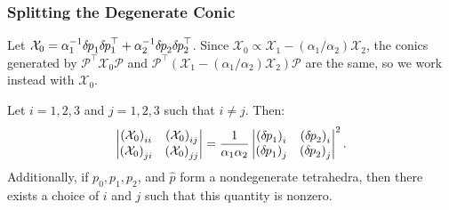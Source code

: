 \documentclass{article}
\begin{document}
\subsubsection*{Splitting the Degenerate Conic}

Let
$\mathcal{X}_0 = \alpha_1^{-1} {\delta \hspace{-0.08em} p}_1 {\delta \hspace{-0.08em} p}_1^\top +
\alpha_2^{-1} {\delta \hspace{-0.08em} p}_2 {\delta \hspace{-0.08em} p}_2^\top$. Since
$\mathcal{X}_0 \propto \mathcal{X}_1 - (\alpha_1/\alpha_2)
\mathcal{X}_2$, the conics generated by
$\mathcal{P}^\top \mathcal{X}_0 \mathcal{P}$ and
$\mathcal{P}^\top {(\mathcal{X}_1 - (\alpha_1/\alpha_2)
  \mathcal{X}_2)} \mathcal{P}$ are the same, so we work instead with
$\mathcal{X}_0$.

\begin{lemma}
  Let $i = 1, 2, 3$ and $j = 1, 2, 3$ such that $i \neq j$. Then:
  \begin{align*}
    \left|\begin{matrix}
      {(\mathcal{X}_0)}_{ii} & {(\mathcal{X}_0)}_{ij} \\
      {(\mathcal{X}_0)}_{ji} & {(\mathcal{X}_0)}_{jj}
    \end{matrix}\right| = \frac{1}{\alpha_1 \alpha_2} \left|\begin{matrix}
      {({\delta \hspace{-0.08em} p}_1)}_i & {({\delta \hspace{-0.08em} p}_2)}_i \\
      {({\delta \hspace{-0.08em} p}_1)}_j & {({\delta \hspace{-0.08em} p}_2)}_j
    \end{matrix}\right|^2.
  \end{align*}
  Additionally, if $p_0, p_1, p_2$, and $\hat{p}$ form a nondegenerate
  tetrahedra, then there exists a choice of $i$ and $j$ such that this
  quantity is nonzero.
\end{lemma}
\end{document}
